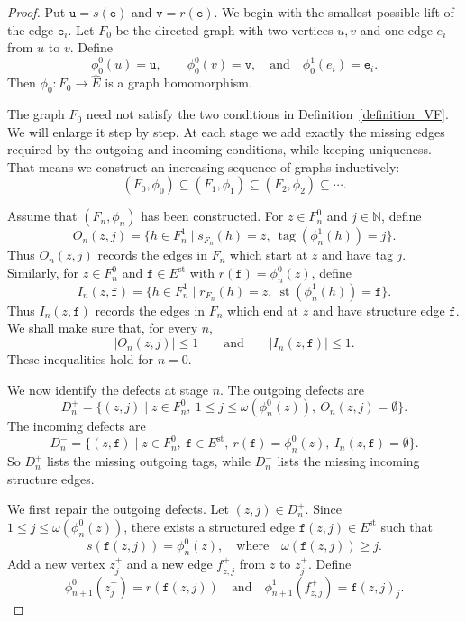 \documentclass{article}
\theoremstyle{definition}
\begin{document}
\begin{proof}
Put $\mathtt{u}=s(\mathtt{e})$ and $\mathtt{v}=r(\mathtt{e})$. We begin with the smallest possible lift of the edge $\mathtt{e}_i$. Let $F_0$ be the directed graph with two vertices $u,v$ and one edge $e_i$ from $u$ to $v$. Define
$$
\phi_0^0(u)=\mathtt{u},\qquad
\phi_0^0(v)=\mathtt{v},\quad\text{and}\quad
\phi_0^1(e_i)=\mathtt{e}_i.
$$
Then $\phi_0:F_0\to \widehat E$ is a graph homomorphism.

The graph $F_0$ need not satisfy the two conditions in Definition~\ref{definition_VF}. We will enlarge it step by step. At each stage we add exactly the missing edges required by the outgoing and incoming conditions, while keeping uniqueness. That means we construct an increasing sequence of graphs inductively:
$$
(F_0,\phi_0)\subseteq (F_1,\phi_1)\subseteq (F_2,\phi_2)\subseteq\cdots .
$$

Assume that $(F_n,\phi_n)$ has been constructed. For $z\in F_n^0$ and $j\in\mathbb N$, define
$$
O_n(z,j)=
\{h\in F_n^1\mid s_{F_n}(h)=z,\ 
\operatorname{tag}(\phi_n^1(h))=j\}.
$$
Thus $O_n(z,j)$ records the edges in $F_n$ which start at $z$ and have tag $j$. Similarly, for $z\in F_n^0$ and $\mathtt{f}\in E^{\mathrm{st}}$ with $r(\mathtt{f})=\phi_n^0(z)$, define
$$
I_n(z,\mathtt{f})=
\{h\in F_n^1\mid r_{F_n}(h)=z,\ 
\operatorname{st}(\phi_n^1(h))=\mathtt{f}\}.
$$
Thus $I_n(z,\mathtt{f})$ records the edges in $F_n$ which end at $z$ and have structure edge $\mathtt{f}$. We shall make sure that, for every $n$,
\begin{equation}\label{eq:In-On}
|O_n(z,j)|\leq 1\qquad \text{and}\qquad |I_n(z,\mathtt{f})|\leq 1.
\end{equation}
These inequalities hold for $n=0$.

We now identify the defects at stage $n$. The outgoing defects are
$$
D_n^+=\{(z,j)\mid z\in F_n^0,\ 1\leq j\leq \omega(\phi_n^0(z)),
\ O_n(z,j)=\emptyset\}.
$$
The incoming defects are
$$
D_n^-=\{(z,\mathtt{f})\mid z\in F_n^0,\ \mathtt{f}\in E^{\mathrm{st}},
\ r(\mathtt{f})=\phi_n^0(z),\ I_n(z,\mathtt{f})=\emptyset\}.
$$
So $D_n^+$ lists the missing outgoing tags, while $D_n^-$ lists the missing incoming structure edges.

We first repair the outgoing defects. Let $(z,j)\in D_n^+$. Since $1\leq j\leq \omega(\phi_n^0(z))$, there exists a structured edge $\mathtt{f}(z,j)\in E^{\mathrm{st}}$ such that
$$
s(\mathtt{f}(z,j))=\phi_n^0(z),\quad\text{where}\quad
\omega(\mathtt{f}(z,j))\geq j.
$$
Add a new vertex $z_j^+$ and a new edge $f_{z,j}^+$ from $z$ to $z_j^+$. Define
$$
\phi_{n+1}^0(z_j^+)=r(\mathtt{f}(z,j))\quad\text{and}\quad
\phi_{n+1}^1(f_{z,j}^+)=\mathtt{f}(z,j)_j.
$$


\end{proof}
\end{document}
